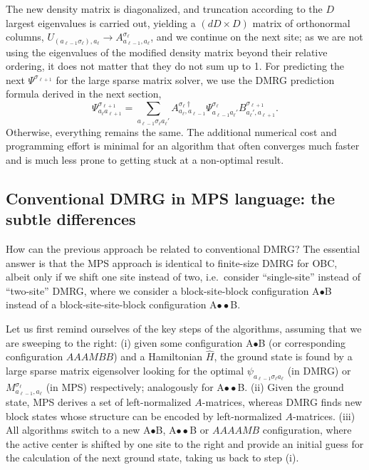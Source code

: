 The new density matrix is diagonalized, and truncation according to the $D$ largest eigenvalues is carried out, yielding a $(dD \times D)$ matrix of orthonormal columns, $U_{(a_{\ell-1}\sigma_{\ell}), a_{\ell}} \rightarrow A^{\sigma_{\ell}}_{a_{\ell-1}, a_{\ell}}$, and we continue on the next site; as we are not using the eigenvalues of the modified density matrix beyond their relative ordering, it does not matter that they do not sum up to 1. For predicting the next $\Psi^{\sigma_{\ell+1}}$ for the large sparse matrix solver, we use the DMRG prediction formula derived in the next section,
\begin{equation}
\Psi^{\sigma_{\ell+1}}_{a_{\ell}a_{\ell+1}} = 
\sum_{a_{\ell-1}\sigma_{\ell} a_{\ell}'} 
A^{\sigma_{\ell} \dagger}_{a_{\ell},a_{\ell-1}} \Psi^{\sigma_{\ell}}_{a_{\ell-1}a_{\ell}'}  B^{\sigma_{\ell+1}}_{a_{\ell}', a_{\ell+1}} .
\end{equation}
Otherwise, everything remains the same. The additional numerical cost and programming effort is minimal for an algorithm that often converges much faster and is much less prone to getting stuck at a non-optimal result.

\subsection{Conventional DMRG in MPS language: the subtle differences}   
\label{subsec:conventionalDMRGinMPS}
How can the previous approach be related to conventional DMRG? The essential answer is that the MPS approach is identical to finite-size DMRG for OBC, albeit only if we shift one site instead of two,
i.e.\ consider ``single-site'' instead of ``two-site'' DMRG, where we consider a block-site-block configuration A$\bullet$B instead of a block-site-site-block configuration A$\bullet\bullet$B.

Let us first remind ourselves of the key steps of the algorithms, assuming that we are sweeping to the right: (i) given some configuration A$\bullet$B (or corresponding configuration $AAAMBB$) and a Hamiltonian $\hat{H}$, the ground state is found by a large sparse matrix eigensolver looking for the optimal $\psi_{a_{\ell-1} \sigma_\ell a_\ell}$ (in DMRG) or $M^{\sigma_\ell}_{a_{\ell-1}, a_\ell}$ (in MPS) respectively; analogously for A$\bullet\bullet$B. (ii) Given the ground state, MPS derives a set of left-normalized $A$-matrices, whereas DMRG finds new block states whose structure can be encoded by left-normalized $A$-matrices. (iii) All algorithms switch to a new A$\bullet$B, A$\bullet\bullet$B or $AAAAMB$ configuration, where the active center is shifted by one site to the right and provide an initial guess for the calculation of the next ground state, taking us back to step (i).

